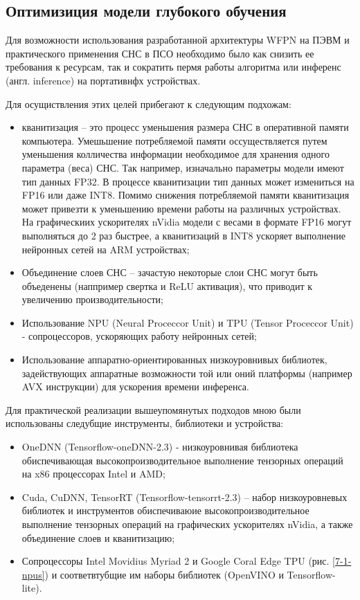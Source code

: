 \subsection{Оптимизиция модели глубокого обучения} \label{sect-7-1}

Для возможности использования разработанной архитектуры WFPN на ПЭВМ и практического применения СНС в ПСО необходимо было как снизить ее требования к ресурсам, так и сократить пермя работы алгоритма или инференс (англ. inference) на портативнфх устройствах.

Для осущиствления этих целей прибегают к следующим подхожам:
\begin{itemize}
    \item кванитизация -- это процесс уменьшения размера СНС в оперативной памяти компьютера. Умешьшение потребляемой памяти оссуществляется путем уменьшения колличества информации необходимое для хранения одного параметра (веса) СНС. Так например, изначально параметры модели имеют тип данных FP32. В процессе кванитизации тип данных может измениться на FP16 или даже INT8. Помимо снижения потребляемой памяти кванитизация может привезти к уменьшению времени работы на различных устройствах. На графическиих ускорителях nVidia модели с весами в формате FP16 могут выполняться до 2 раз быстрее, а кванитизаций в INT8 ускоряет выполнение нейронных сетей на ARM устройствах;
    \item Объединение слоев СНС -- зачастую некоторые слои СНС могут быть объеденены (наппример свертка и ReLU активация), что приводит к увеличению производительности;
    \item Использование NPU (Neural Proceccor Unit) и TPU (Tensor Proceccor Unit) - сопроцессоров, ускоряющих работу нейронных сетей;
    \item Использование аппаратно-ориентированных низкоуровнивых библиотек, задействующих аппаратные возможности той или оний платформы (например AVX инструкции) для ускорения времени инференса.
\end{itemize}

Для практической реализации вышеупомянутых подходов мною были использованы следубщие инструменты, библиотеки и устройства:

\begin{itemize}
    \item OneDNN (Tensorflow-oneDNN-2.3) - низкоуровнивая библиотека обиспечивающая высокопроизводительное выполнение тензорных операций на x86 процессорах Intel и AMD;
    \item Cuda, CuDNN, TensorRT (Tensorflow-tensorrt-2.3) -- набор низкоуровневых библиотек и инструментов обиспечиваюие высокопроизводительное выполнение тензорных операций на графических ускорителях nVidia, а также объединение слоев и кванитизацию;
    \item Сопроцессоры Intel Movidius Myriad 2 и Google Coral Edge TPU (рис. \ref{7-1-npus}) и соответвтубщие им наборы библиотек (OpenVINO и Tensorflow-lite).
\end{itemize}

